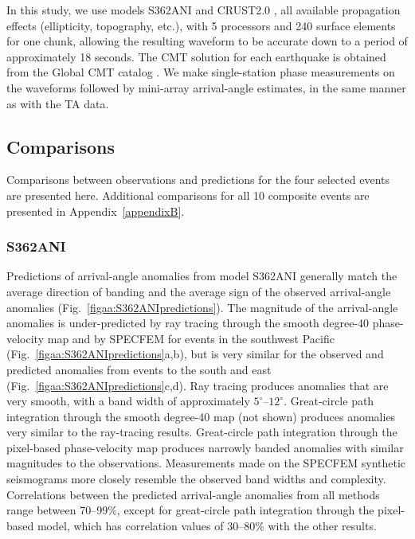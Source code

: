 \documentclass[12pt,oneside]{book}
\newcommand{\degree}[1]{\mbox{$#1^{\circ}$}}
\begin{document}
In this study, we use models S362ANI and CRUST2.0 \citep{CRUST2}, all available propagation effects (ellipticity, topography, etc.), with 5 processors and 240 surface elements for one chunk, allowing the resulting waveform to be accurate down to a period of approximately 18 seconds. The CMT solution for each earthquake is obtained from the Global CMT catalog \citep{Dziewonski1981,Ekstrom2012}. We make single-station phase measurements on the waveforms followed by mini-array arrival-angle estimates, in the same manner as with the TA data.  

\subsection{Comparisons}\label{sec:comparisons}
Comparisons between observations and predictions for the four selected events are presented here. Additional comparisons for all 10 composite events are presented in Appendix~\ref{appendixB}. 

\subsubsection*{S362ANI}
Predictions of arrival-angle anomalies from model S362ANI generally match the average direction of banding and the average sign of the observed arrival-angle anomalies (Fig.~\ref{figaa:S362ANIpredictions}). The magnitude of the arrival-angle anomalies is under-predicted by ray tracing through the smooth degree-40 phase-velocity map and by SPECFEM for events in the southwest Pacific (Fig.~\ref{figaa:S362ANIpredictions}a,b), but is very similar for the observed and predicted anomalies from events to the south and east (Fig.~\ref{figaa:S362ANIpredictions}c,d). Ray tracing produces anomalies that are very smooth, with a band width of approximately \degree{5}--\degree{12}. Great-circle path integration through the smooth degree-40 map (not shown) produces anomalies very similar to the ray-tracing results. Great-circle path integration through the pixel-based phase-velocity map produces narrowly banded anomalies with similar magnitudes to the observations. Measurements made on the SPECFEM synthetic seismograms more closely resemble the observed band widths and complexity. Correlations between the predicted arrival-angle anomalies from all methods range between 70--99\%, except for great-circle path integration through the pixel-based model, which has correlation values of 30--80\% with the other results. 
\end{document}
